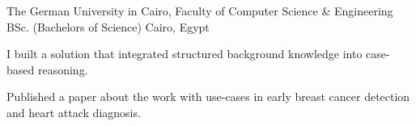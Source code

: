 \begin{cventries}
  \cventry
    {The German University in Cairo, Faculty of Computer Science \& Engineering}  %
    {BSc. (Bachelors of Science)} %
    {}%
    {Cairo, Egypt} %
    {	
      \begin{cvitems} %
		\item {I built a solution that integrated structured background knowledge into case-based reasoning.}
		\item {Published a paper about the work with use-cases in early breast cancer detection and heart attack diagnosis.}
    \end{cvitems}
    }
    
    
    
    
    



\end{cventries}
